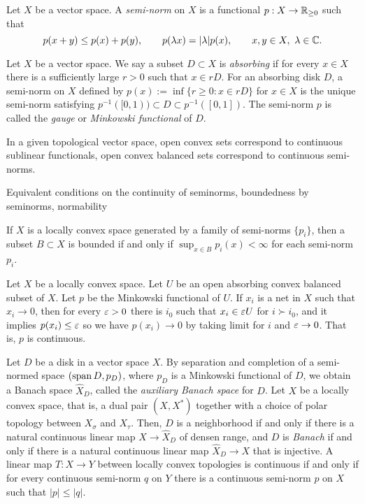 \documentclass{../../large}
\begin{document}
\begin{prb}[Seminorms]
Let $X$ be a vector space.
A \emph{semi-norm} on $X$ is a functional $p:X\to\mathbb{R}_{\ge0}$ such that
\[p(x+y)\le p(x)+p(y),\qquad p(\lambda x)=|\lambda|p(x),\qquad x,y\in X,\ \lambda\in\mathbb{C}.\]


\end{prb}

\begin{prb}
Let $X$ be a vector space.
We say a subset $D\subset X$ is \emph{absorbing} if for every $x\in X$ there is a sufficiently large $r>0$ such that $x\in rD$.
For an absorbing disk $D$, a semi-norm on $X$ defined by $p(x):=\inf\{r\ge0:x\in rD\}$ for $x\in X$ is the unique semi-norm satisfying $p^{-1}([0,1))\subset D\subset p^{-1}([0,1])$.
The semi-norm $p$ is called the \emph{gauge} or \emph{Minkowski functional} of $D$.

In a given topological vector space, open convex sets correspond to continuous sublinear functionals, open convex balanced sets correspond to continuous semi-norms.

Equivalent conditions on the continuity of seminorms,
boundedness by seminorms,
normability
\begin{parts}
\item 
\end{parts}
\end{prb}
\begin{pf}


If $X$ is a locally convex space generated by a family of semi-norms $\{p_i\}$, then a subset $B\subset X$ is bounded if and only if $\sup_{x\in B}p_i(x)<\infty$ for each semi-norm $p_i$.
\end{pf}

Let $X$ be a locally convex space.
Let $U$ be an open absorbing convex balanced subset of $X$.
Let $p$ be the Minkowski functional of $U$.
If $x_i$ is a net in $X$ such that $x_i\to0$, then for every $\varepsilon>0$ there is $i_0$ such that $x_i\in\varepsilon U$ for $i\succ i_0$, and it implies $p(x_i)\le\varepsilon$ so we have $p(x_i)\to0$ by taking limit for $i$ and $\varepsilon\to0$.
That is, $p$ is continuous.




Let $D$ be a disk in a vector space $X$.
By separation and completion of a semi-normed space $(\operatorname{span} D,p_D)$, where $p_D$ is a Minkowski functional of $D$, we obtain a Banach space $\hat X_D$, called the \emph{auxiliary Banach space} for $D$.
Let $X$ be a locally convex space, that is, a dual pair $(X,X^*)$ together with a choice of polar topology between $X_\sigma$ and $X_\tau$.
Then, $D$ is a neighborhood if and only if there is a natural continuous linear map $X\to\hat X_D$ of densen range, and $D$ is \emph{Banach} if and only if there is a natural continuous linear map $\hat X_D\to X$ that is injective.
A linear map $T:X\to Y$ between locally convex topologies is continuous if and only if for every continuous semi-norm $q$ on $Y$ there is a continuous semi-norm $p$ on $X$ such that $|p|\le|q|$.
\end{document}
